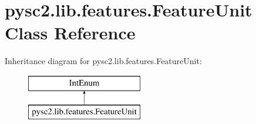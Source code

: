 \hypertarget{classpysc2_1_1lib_1_1features_1_1_feature_unit}{}\section{pysc2.\+lib.\+features.\+Feature\+Unit Class Reference}
\label{classpysc2_1_1lib_1_1features_1_1_feature_unit}
Inheritance diagram for pysc2.\+lib.\+features.\+Feature\+Unit\+:\begin{figure}[H]
\begin{center}
\leavevmode
\includegraphics[height=2.000000cm]{classpysc2_1_1lib_1_1features_1_1_feature_unit}
\end{center}
\end{figure}
